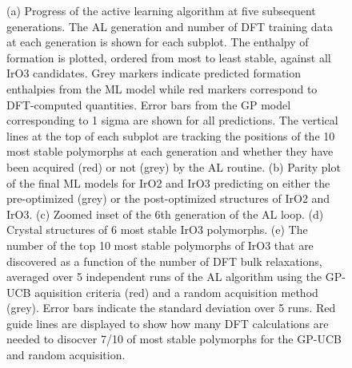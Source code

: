 \begin{figure}[!htb]
\centering
{}
\caption{\label{fig:iro2_al}
(a) Progress of the active learning algorithm at five subsequent generations.
%
The AL generation and number of DFT training data at each generation is shown for each subplot.
%
The enthalpy of formation is plotted, ordered from most to least stable, against all IrO3 candidates.
%
Grey markers indicate predicted formation enthalpies from the ML model while red markers correspond to DFT-computed quantities.
%
Error bars from the GP model corresponding to 1 sigma are shown for all predictions.
%
The vertical lines at the top of each subplot are tracking the positions of the 10 most stable polymorphs at each generation and whether they have been acquired (red) or not (grey) by the AL routine.
(b) Parity plot of the final ML models for IrO2 and IrO3 predicting on either the pre-optimized (grey) or the post-optimized structures of IrO2 and IrO3.
(c) Zoomed inset of the 6th generation of the AL loop.
(d) Crystal structures of 6 most stable IrO3 polymorphs.
(e) The number of the top 10 most stable polymorphs of IrO3 that are discovered as a function of the number of DFT bulk relaxations, averaged over 5 independent runs of the AL algorithm using the GP-UCB aquisition criteria (red) and a random acquisition method (grey).
%
Error bars indicate the standard deviation over 5 runs.
%
Red guide lines are displayed to show how many DFT calculations are needed to disocver 7/10 of most stable polymorphs for the GP-UCB and random acquisition.
}
\end{figure}



